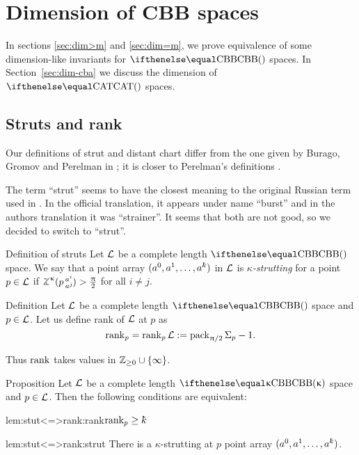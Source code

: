 \chapter{Dimension of CBB spaces}

In sections \ref{sec:dim>m} and \ref{sec:dim=m},
we prove equivalence of some dimension-like invariants for $\Alex{}$ spaces.
In Section~\ref{sec:dim-cba} we discuss the dimension of  $\CAT{}$ spaces.


\section{Struts and rank}\label{sec:struts+rank}

Our definitions of strut 
and distant chart 
differ from the one 
given by 
Burago, 
Gromov 
and Perelman in \cite{BGP};
it is closer to Perelman's definitions \cite{perelman:spaces2,perelman:morse}.

The term ``strut'' seems to have the closest meaning to the original Russian term used in \cite{BGP}.
In the official translation,
it appears under name ``burst'' 
and in the authors translation it was ``strainer''.
It seems that both are not good, 
so we decided to switch to ``strut''.

\begin{thm}{Definition of struts}\label{def:strut-I}
Let $\mathcal{L}$ be a complete length $\Alex{}$ space.
We say that a point array $(a^0,a^1,\dots,a^\kay)$ in $\mathcal{L}$
 is \emph{$\kappa$-strutting} for a point $p\in\spc{L}$ if $\angk\kappa p {a^i}{a^j}>\tfrac\pi2$ for all $i\not=j$.
\end{thm} 



\begin{thm}{Definition}\label{def:rank}
Let $\mathcal{L}$ be a complete length $\Alex{}$ space
and $p\in \spc{L}$.
Let us define rank of $\mathcal{L}$ at $p$ as 
\[\mathop{\rm rank}\nolimits_p=\mathop{\rm rank}\nolimits_p\mathcal{L}
:=\mathop{\rm pack}\nolimits_{\uppi/2}\Sigma_p-1.\]

\end{thm}




Thus $\mathop{\rm rank}\nolimits$ takes values in $\ZZ_{\ge0}\cup\{\infty\}$.


\begin{thm}{Proposition}\label{prop:stutt}
Let $\mathcal{L}$ be a complete length $\Alex{\kappa}$ space 
and $p\in \spc{L}$.
Then the following conditions are equivalent:

\begin{subthm}{lem:stut<=>rank:rank}$\rank_p\ge\kay$
\end{subthm}

\begin{subthm}{lem:stut<=>rank:strut}
There is a $\kappa$-strutting at $p$ point array $(a^0,a^1,\dots,a^\kay)$.
\end{subthm}
\end{thm}

